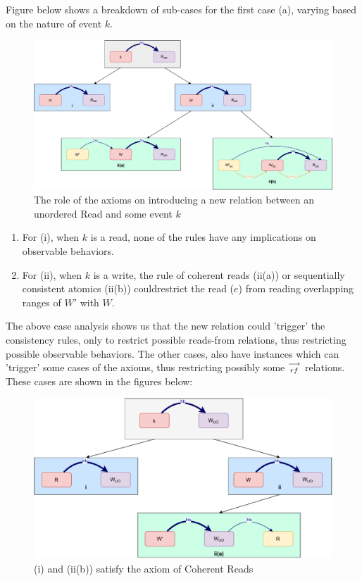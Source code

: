     Figure below shows a breakdown of sub-cases for the first case (a), varying based
    on the nature of event $k$.
    \begin{figure}[H]
        \centering
        \includegraphics[scale=0.6]{Q3_(b)Case1.pdf}
        \caption{The role of the axioms on introducing a new relation between an unordered Read and some event $k$}
        \label{fig:my_label}
    \end{figure}
    
    \begin{enumerate}
        \item For (i), when $k$ is a read, none of the rules have any implications on observable behaviors.
        \item For (ii), when $k$ is a write, the rule of coherent reads (ii(a)) or sequentially consistent atomics (ii(b)) couldrestrict the read ($e$) from reading overlapping ranges of $W'$ with $W$.
    \end{enumerate}
    
    The above case analysis shows us that the new relation could 'trigger' the consistency rules, only to restrict possible reads-from relations, thus restricting possible observable behaviors. 
    The other cases, also have instances which can 'trigger' some cases of the axioms, thus restricting possibly some $\stackrel{\longrightarrow}{_{rf}}$ relations. These cases are shown in the figures below: 
    \begin{figure}[H]
        \centering
        \includegraphics[scale=0.6]{Q3_(c)Case2.pdf}
        \caption{(i) and (ii(b)) satisfy the axiom of Coherent Reads}
        \label{fig:my_label}
    \end{figure}
          

